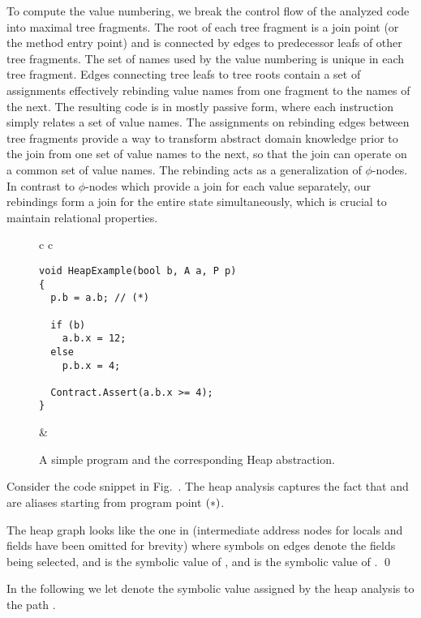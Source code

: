\documentclass{llncs}
\begin{document}
To compute the value numbering, we break the control flow of the
analyzed code into maximal tree fragments.  The root of each tree
fragment is a join point (or the method entry point) and is connected
by edges to predecessor leafs of other tree fragments.  The set of
names used by the value numbering is unique in each tree fragment.
Edges connecting tree leafs to tree roots contain a set of assignments
effectively rebinding value names from one fragment to the names of
the next. The resulting code is in mostly passive form, where each
instruction simply relates a set of value names.  The assignments on
rebinding edges between tree fragments provide a way to transform
abstract domain knowledge prior to the join from one set of value
names to the next, so that the join can operate on a common set of
value names.  The rebinding acts as a generalization of $\phi$-nodes.
In contrast to $\phi$-nodes which provide a join for each value
separately, our rebindings form a join for the entire state
simultaneously, which is crucial to maintain relational properties.

\begin{figure}[t]
\begin{tabular}{c c}
\begin{lstlisting}
void HeapExample(bool b, A a, P p)
{  
  p.b = a.b; // (*)
  
  if (b)
    a.b.x = 12;
  else
    p.b.x = 4;

  Contract.Assert(a.b.x >= 4);
}
\end{lstlisting}
\hspace{1cm}
&
\raisebox{2cm}
{
}
\end{tabular}
\caption{A simple program and the corresponding Heap abstraction.}
\label{fig:egraph}
\end{figure}

\begin{example}
\label{ex:heap}
Consider the code snippet in Fig.~. 
The heap analysis captures the fact that  and  are aliases starting from program point $\mathtt{(*)}$.  

The heap graph looks like  the one in  (intermediate address nodes for locals and fields have been omitted for brevity)
where symbols on edges denote the fields being selected, and  is the symbolic value of , and  is the symbolic value of . \qed
\end{example}
In the following we let  denote the symbolic value assigned by the heap analysis to the path .
\end{document}
